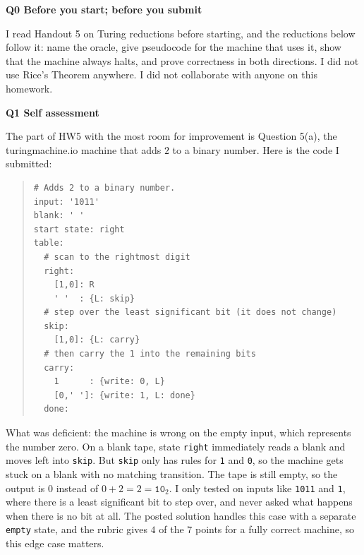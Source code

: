 \documentclass[11pt]{article}
\newcommand{\qpage}[1]{\clearpage\noindent\textbf{\large #1}\par\medskip}
\begin{document}
\noindent\textbf{\large Q0 Before you start; before you submit}\par\medskip

I read Handout 5 on Turing reductions before starting, and the reductions below follow it: name the oracle, give pseudocode for the machine that uses it, show that the machine always halts, and prove correctness in both directions.
I did not use Rice's Theorem anywhere.
I did not collaborate with anyone on this homework.

\qpage{Q1 Self assessment}

The part of HW5 with the most room for improvement is Question 5(a), the turingmachine.io machine that adds $2$ to a binary number.
Here is the code I submitted:

\begin{quote}\small
\begin{verbatim}
# Adds 2 to a binary number.
input: '1011'
blank: ' '
start state: right
table:
  # scan to the rightmost digit
  right:
    [1,0]: R
    ' '  : {L: skip}
  # step over the least significant bit (it does not change)
  skip:
    [1,0]: {L: carry}
  # then carry the 1 into the remaining bits
  carry:
    1      : {write: 0, L}
    [0,' ']: {write: 1, L: done}
  done:
\end{verbatim}
\end{quote}

What was deficient: the machine is wrong on the empty input, which represents the number zero.
On a blank tape, state \texttt{right} immediately reads a blank and moves left into \texttt{skip}.
But \texttt{skip} only has rules for \texttt{1} and \texttt{0}, so the machine gets stuck on a blank with no matching transition.
The tape is still empty, so the output is $0$ instead of $0 + 2 = 2 = \texttt{10}_2$.
I only tested on inputs like \texttt{1011} and \texttt{1}, where there is a least significant bit to step over, and never asked what happens when there is no bit at all.
The posted solution handles this case with a separate \texttt{empty} state, and the rubric gives $4$ of the $7$ points for a fully correct machine, so this edge case matters.
\end{document}
